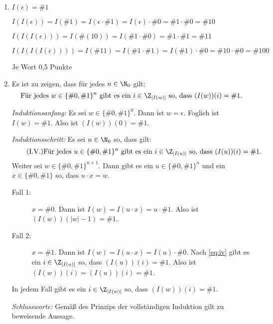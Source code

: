 \documentclass[12pt]{article}
\begin{document}
\begin{loesung}
  \begin{enumerate}
    \item $I(\epsilon) = \#1$

          $I(I(\epsilon)) = I(\#1) = I(\epsilon \cdot \#1) = I(\epsilon) \cdot \#0 = \#1 \cdot \#0 = \#{10}$

          $I(I(I(\epsilon))) = I(\#(10)) = I(\#1 \cdot \#0) = \#1 \cdot \#1 = \#{11}$

          $I(I(I(I(\epsilon)))) = I(\#{11}) = I(\#1 \cdot \#1) = I(\#1) \cdot \#0 = \#{10} \cdot \#0 = \#{100}$

          \begin{korrektur}
            Je Wort 0,5 Punkte
          \end{korrektur}
    \item Es ist zu zeigen, dass für jedes $n \in \N_0$ gilt:
          \begin{equation*}
            \text{Für jedes } w \in \{\#0, \#1\}^n \text{ gibt es ein } i \in \Z_{|I(w)|} \text{ so, dass } (I(w))(i) = \#1.
          \end{equation*}

          \emph{Induktionsanfang:} Es sei $w \in \{\#0, \#1\}^0$. Dann ist $w = \epsilon$. Foglich ist $I(w) = \#1$. Also ist $(I(w))(0) = \#1$.

          \emph{Induktionsschritt:} Es sei $n \in \N_0$ so, dass gilt:
          \begin{equation}\label{eq:iv}\tag{I.V.}
            \text{Für jedes } u \in \{\#0, \#1\}^n \text{ gibt es ein } i \in \Z_{|I(u)|} \text{ so, dass } (I(u))(i) = \#1.
          \end{equation}
          Weiter sei $w \in \{\#0, \#1\}^{n + 1}$. Dann gibt es ein $u \in \{\#0, \#1\}^n$ und ein $x \in \{\#0, \#1\}$ so, dass $u \cdot x = w$.
          \begin{description}
            \item[Fall 1:] $x = \#0$. Dann ist $I(w) = I(u \cdot x) = u \cdot \#1$. Also ist $(I(w))(|w| - 1) = \#1$.
            \item[Fall 2:] $x = \#1$. Dann ist $I(w) = I(u \cdot x) = I(u) \cdot \#0$. Nach \eqref{eq:iv} gibt es ein $i \in \Z_{|I(u)|}$ so, dass $(I(u))(i) = \#1$. Also ist $(I(w))(i) = (I(u))(i) = \#1$.
          \end{description}
          In jedem Fall gibt es ein $i \in \Z_{|I(w)|}$ so, dass $(I(w))(i) = \#1$.

          \emph{Schlussworte:} Gemäß des Prinzips der vollständigen Induktion gilt zu beweisende Aussage.


\end{enumerate}
\end{loesung}
\end{document}
